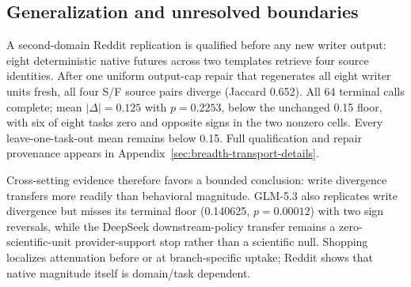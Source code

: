\subsection{Generalization and unresolved boundaries}
A second-domain Reddit replication is qualified before any new writer output: eight deterministic native futures across two templates retrieve four source identities. After one uniform output-cap repair that regenerates all eight writer units fresh, all four S/F source pairs diverge (Jaccard 0.652). All 64 terminal calls complete; mean $|\Delta|=0.125$ with $p=0.2253$, below the unchanged 0.15 floor, with six of eight tasks zero and opposite signs in the two nonzero cells. Every leave-one-task-out mean remains below 0.15. Full qualification and repair provenance appears in Appendix~\ref{sec:breadth-transport-details}.

Cross-setting evidence therefore favors a bounded conclusion: write divergence transfers more readily than behavioral magnitude. GLM-5.3 also replicates write divergence but misses its terminal floor (0.140625, $p=0.00012$) with two sign reversals, while the DeepSeek downstream-policy transfer remains a zero-scientific-unit provider-support stop rather than a scientific null. Shopping localizes attenuation before or at branch-specific uptake; Reddit shows that native magnitude itself is domain/task dependent.
